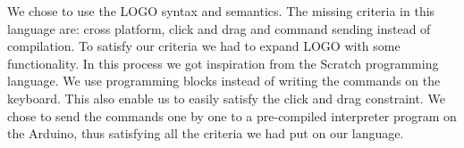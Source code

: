 \bigskip\noindent
We chose to use the LOGO syntax and semantics. The missing criteria in this language are: cross platform, click and drag and command sending instead of compilation. To satisfy our criteria we had to expand LOGO with some functionality. In this process we got inspiration from the Scratch programming language. We use programming blocks instead of writing the commands on the keyboard. This also enable us to easily satisfy the click and drag constraint. We chose to send the commands one by one to a pre-compiled interpreter program on the Arduino, thus satisfying all the criteria we had put on our language.
